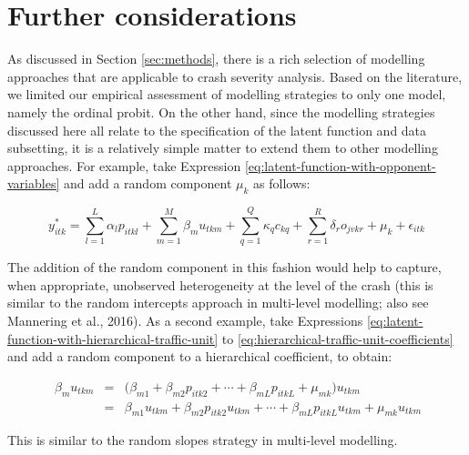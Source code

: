 \documentclass[]{elsarticle} %
\begin{document}
\hypertarget{sec:further-considerations}{%
\section{Further considerations}\label{sec:further-considerations}}

As discussed in Section \ref{sec:methods}, there is a rich selection of
modelling approaches that are applicable to crash severity analysis.
Based on the literature, we limited our empirical assessment of
modelling strategies to only one model, namely the ordinal probit. On
the other hand, since the modelling strategies discussed here all relate
to the specification of the latent function and data subsetting, it is a
relatively simple matter to extend them to other modelling approaches.
For example, take Expression
\ref{eq:latent-function-with-opponent-variables} and add a random
component \(\mu_{k}\) as follows:

\begin{equation}
\label{eq:latent-function-with-opponent-variables-and-random-component}
y_{itk}^*=\sum_{l=1}^L\alpha_lp_{itkl} + \sum_{m=1}^M\beta_mu_{tkm} + \sum_{q=1}^Q\kappa_qc_{kq} + \sum_{r=1}^R\delta_ro_{jvkr} + \mu_{k} + \epsilon_{itk}
\end{equation}

The addition of the random component in this fashion would help to
capture, when appropriate, unobserved heterogeneity at the level of the
crash (this is similar to the random intercepts approach in multi-level
modelling; also see Mannering et al., 2016). As a second example, take
Expressions \ref{eq:latent-function-with-hierarchical-traffic-unit} to
\ref{eq:hierarchical-traffic-unit-coefficients} and add a random
component to a hierarchical coefficient, to obtain:

\begin{equation}
\label{eq:hierarchical-traffic-unit-coefficients-with-random-component}
\begin{array}{rcl}\
\beta_{m}u_{tkm} &=& \big( \beta_{m1} + \beta_{m2}p_{itk2} + \cdots + \beta_{mL}p_{itkL} + \mu_{mk}\big)u_{tkm}\\ 
&=& \beta_{m1}u_{tkm} + \beta_{m2}p_{itk2}u_{tkm} + \cdots + \beta_{mL}p_{itkL}u_{tkm} + \mu_{mk}u_{tkm}
\end{array}
\end{equation}

This is similar to the random slopes strategy in multi-level modelling.
\end{document}
